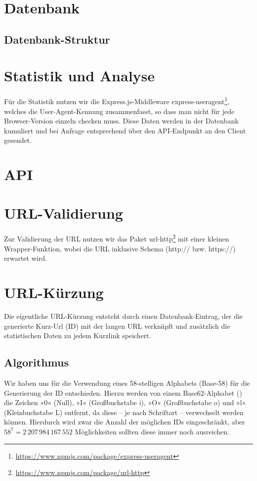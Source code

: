 \documentclass[a4paper,11pt,DIV=12,overfullrule=on]{scrreprt}
\begin{document}
\section{Datenbank}
\subsection{Datenbank-Struktur}
\section{Statistik und Analyse}
Für die Statistik nutzen wir die Express.js-Middleware {\ttfamily express-useragent}\footnote{\href{https://www.npmjs.com/package/express-useragent}{https://www.npmjs.com/package/express-useragent}}, welches die User-Agent-Kennung zusammenfasst, so dass man nicht für jede Browser-Version einzeln checken muss. Diese Daten werden in der Datenbank kumuliert und bei Anfrage entsprechend über den API-Endpunkt an den Client gesendet.

\section{API}
\section{URL-Validierung}
Zur Validierung der URL nutzen wir das Paket {\ttfamily url-http}\footnote{\href{https://www.npmjs.com/package/url-http}{https://www.npmjs.com/package/url-http}} mit einer kleinen Wrapper-Funktion, wobei die URL inklusive Schema ({\ttfamily http://} bzw. {\ttfamily https://}) erwartet wird.
\section{URL-Kürzung}
Die eigentliche URL-Kürzung entsteht durch einen Datenbank-Eintrag, der die generierte Kurz-Url (ID) mit der langen URL verknüpft und zusätzlich die statistischen Daten zu jedem Kurzlink speichert.
\subsection{Algorithmus}
Wir haben uns für die Verwendung eines 58-stelligen Alphabets (Base-58) für die Generierung der ID entschieden. Hierzu werden von einem Base62-Alphabet ({\ttfamily[0-9A-Za-z]}) die Zeichen »0« (Null), »I« (Großbuchstabe i), »O« (Großbuchstabe o) und »l« (Kleinbuchstabe L) entfernt, da diese – je nach Schriftart – verwechselt werden können. Hierdurch wird zwar die Anzahl der möglichen IDs eingeschränkt, aber $58^7 =  2\,207\,984\,167\,552$ Möglichkeiten sollten diese immer noch ausreichen.
\end{document}
